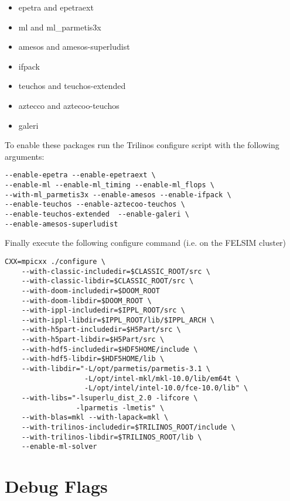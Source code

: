 \begin{itemize}
  \item epetra and epetraext
  \item ml and ml\_parmetis3x
  \item amesos and amesos-superludist
  \item ifpack
  \item teuchos and teuchos-extended
  \item aztecco and aztecoo-teuchos
  \item galeri 
\end{itemize}
To enable these packages run the Trilinos configure script with the following arguments:
\begin{footnotesize}
\begin{verbatim}
--enable-epetra --enable-epetraext \
--enable-ml --enable-ml_timing --enable-ml_flops \
--with-ml_parmetis3x --enable-amesos --enable-ifpack \
--enable-teuchos --enable-aztecoo-teuchos \
--enable-teuchos-extended  --enable-galeri \
--enable-amesos-superludist
\end{verbatim}
\end{footnotesize}
Finally execute the following configure command (i.e. on the FELSIM cluster)
\begin{footnotesize}
\begin{verbatim}
CXX=mpicxx ./configure \
    --with-classic-includedir=$CLASSIC_ROOT/src \
    --with-classic-libdir=$CLASSIC_ROOT/src \
    --with-doom-includedir=$DOOM_ROOT 
    --with-doom-libdir=$DOOM_ROOT \
    --with-ippl-includedir=$IPPL_ROOT/src \
    --with-ippl-libdir=$IPPL_ROOT/lib/$IPPL_ARCH \
    --with-h5part-includedir=$H5Part/src \
    --with-h5part-libdir=$H5Part/src \
    --with-hdf5-includedir=$HDF5HOME/include \
    --with-hdf5-libdir=$HDF5HOME/lib \
    --with-libdir="-L/opt/parmetis/parmetis-3.1 \
                   -L/opt/intel-mkl/mkl-10.0/lib/em64t \
                   -L/opt/intel/intel-10.0/fce-10.0/lib" \
    --with-libs="-lsuperlu_dist_2.0 -lifcore \
                 -lparmetis -lmetis" \
    --with-blas=mkl --with-lapack=mkl \
    --with-trilinos-includedir=$TRILINOS_ROOT/include \
    --with-trilinos-libdir=$TRILINOS_ROOT/lib \
    --enable-ml-solver
\end{verbatim}
\end{footnotesize}

\section{Debug Flags}\label{sec:debugflags}

